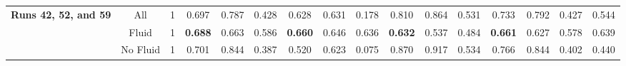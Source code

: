 \begin{table}
{\begin{tabular}{|c|c|c|ccc|ccc|ccc|c|c|c|c|}
			\hline
			\hline
			
			\multirow{3}{*}{\parbox{2cm}{\textbf{Runs 42, 52, and 59}}} & All & 1 & \multicolumn{1}{c|}{0.697} & \multicolumn{1}{c|}{0.787} & 0.428 & \multicolumn{1}{c|}{0.628} & \multicolumn{1}{c|}{0.631} & 0.178 & \multicolumn{1}{c|}{0.810} & \multicolumn{1}{c|}{0.864} & 0.531 & 0.733 & 0.792 & 0.427 & 0.544 \\
			
			& Fluid & 1 & \multicolumn{1}{c|}{\textbf{0.688}} & \multicolumn{1}{c|}{0.663} & 0.586 & \multicolumn{1}{c|}{\textbf{0.660}} & \multicolumn{1}{c|}{0.646} & 0.636 & \multicolumn{1}{c|}{\textbf{0.632}} & \multicolumn{1}{c|}{0.537} & 0.484 & \textbf{0.661} & 0.627 & 0.578 & 0.639 \\
			
			& No Fluid & 1 & \multicolumn{1}{c|}{0.701} & \multicolumn{1}{c|}{0.844} & 0.387 & \multicolumn{1}{c|}{0.520} & \multicolumn{1}{c|}{0.623} & 0.075 & \multicolumn{1}{c|}{0.870} & \multicolumn{1}{c|}{0.917} & 0.534 & 0.766 & 0.844 & 0.402 & 0.440 \\
			
			\hline
			
	\end{tabular}}
	\label{tab:Experiment1VsExperiment2}
\end{table}

